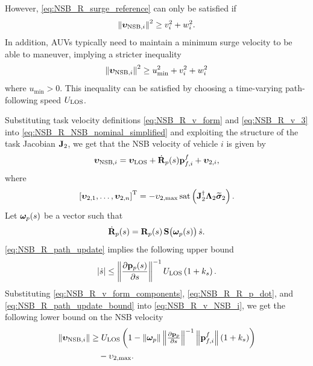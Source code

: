 \noindent However, \eqref{eq:NSB_R_surge_reference} can only be satisfied if 
\begin{equation}
    \left\|\bm{\upsilon}_{{\rm NSB}, i}\right\|^2 \geq v_i^2 + w_i^2.
\end{equation}
In addition, AUVs typically need to maintain a minimum surge velocity to be able to maneuver, implying a stricter inequality 
\begin{equation}
    \left\|\bm{\upsilon}_{{\rm NSB}, i}\right\|^2 \geq u_{\min}^2 + v_i^2 + w_i^2
    \label{eq:NSB_R_NSB_speed_condition}
\end{equation}
where $u_{\min} > 0$.
This inequality can be satisfied by choosing a time-varying path-following speed $U_{\rm LOS}$.



Substituting task velocity definitions \eqref{eq:NSB_R_v_form} and \eqref{eq:NSB_R_v_3} into \eqref{eq:NSB_R_NSB_nominal_simplified} and exploiting the structure of the task Jacobian $\mathbf{J}_2$, we get that the NSB velocity of vehicle $i$ is given by 
\begin{equation}
    \bs{\upsilon}_{{\rm NSB}, i} = \bs{\upsilon}_{\rm LOS} + \dot{\mat{R}}_p(s)\mat{p}_{f,i}^f + \bs{\upsilon}_{2,i}, \label{eq:NSB_R_v_NSB_i}
    \vspace*{-0.55em}
\end{equation}
where 
\begin{equation}
    \left[\bm{\upsilon}_{2, 1}, \ldots, \bm{\upsilon}_{2, n}\right]^{\mathrm{T}} = 
    - \upsilon_{2, \max}\,{\rm sat}\left(\mathbf{J}_2^{\dagger}\bm{\Lambda}_2 \widetilde{\bm{\sigma}}_2\right). \label{eq:NSB_R_v_form_components}
\end{equation}
Let $\bm{\omega}_p(s)$ be a vector such that 
\begin{equation}
    \dot{\mathbf{R}}_p(s) = \mathbf{R}_p(s)\,\mathbf{S}\bigl(\bm{\omega}_p(s)\bigr)\,\dot{s}. \label{eq:NSB_R_R_p_dot}
\end{equation}
\eqref{eq:NSB_R_path_update} implies the following upper bound 
\begin{equation}
    \left|\dot{s}\right| \leq \left\|\frac{\partial \mathbf{p}_p(s)}{\partial s}\right\|^{-1} U_{\rm LOS} \left(1 + k_{s}\right). \label{eq:NSB_R_path_update_bound}
\end{equation}
Substituting \eqref{eq:NSB_R_v_form_components}, \eqref{eq:NSB_R_R_p_dot}, and \eqref{eq:NSB_R_path_update_bound} into \eqref{eq:NSB_R_v_NSB_i}, we get the following lower bound on the NSB velocity 
\begin{align}
    \norm{\bs{\upsilon}_{{\rm NSB}, i}} &\geq U_{\rm LOS} \left(1
        - \norm{\bs{\omega}_p}\norm{\scale[1]{\frac{\partial \mat{p}_p}{\partial s}}}^{-1}\norm{\mat{p}_{f, i}^f} \left(1 + k_{s}\right)\right) \nonumber \\
        &\quad - \upsilon_{2, \max}.
\end{align}

